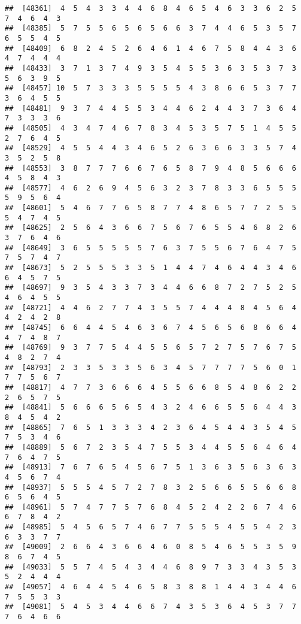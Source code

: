 \documentclass[
]{book}
\begin{document}
\begin{verbatim}
##  [48361]  4  5  4  3  3  4  4  6  8  4  6  5  4  6  3  3  6  2  5  7  4  6  4  3
##  [48385]  5  7  5  5  6  5  6  5  6  6  3  7  4  4  6  5  3  5  7  6  5  5  4  5
##  [48409]  6  8  2  4  5  2  6  4  6  1  4  6  7  5  8  4  4  3  6  4  7  4  4  4
##  [48433]  3  7  1  3  7  4  9  3  5  4  5  5  3  6  3  5  3  7  3  5  6  3  9  5
##  [48457] 10  5  7  3  3  3  5  5  5  5  4  3  8  6  6  5  3  7  7  3  6  4  5  5
##  [48481]  9  3  7  4  4  5  5  3  4  4  6  2  4  4  3  7  3  6  4  7  3  3  3  6
##  [48505]  4  3  4  7  4  6  7  8  3  4  5  3  5  7  5  1  4  5  5  2  7  6  4  5
##  [48529]  4  5  5  4  4  3  4  6  5  2  6  3  6  6  3  3  5  7  4  3  5  2  5  8
##  [48553]  3  8  7  7  7  6  6  7  6  5  8  7  9  4  8  5  6  6  6  4  5  8  4  3
##  [48577]  4  6  2  6  9  4  5  6  3  2  3  7  8  3  3  6  5  5  5  5  9  5  6  4
##  [48601]  5  4  6  7  7  6  5  8  7  7  4  8  6  5  7  7  2  5  5  5  4  7  4  5
##  [48625]  2  5  6  4  3  6  6  7  5  6  7  6  5  5  4  6  8  2  6  3  7  6  4  6
##  [48649]  3  6  5  5  5  5  5  7  6  3  7  5  5  6  7  6  4  7  5  7  5  7  4  7
##  [48673]  5  2  5  5  5  3  3  5  1  4  4  7  4  6  4  4  3  4  6  6  4  5  7  5
##  [48697]  9  3  5  4  3  3  7  3  4  4  6  6  8  7  2  7  5  2  5  4  6  4  5  5
##  [48721]  4  4  6  2  7  7  4  3  5  5  7  4  4  4  8  4  5  6  4  4  2  4  2  8
##  [48745]  6  6  4  4  5  4  6  3  6  7  4  5  6  5  6  8  6  6  4  4  7  4  8  7
##  [48769]  9  3  7  7  5  4  4  5  5  6  5  7  2  7  5  7  6  7  5  4  8  2  7  4
##  [48793]  2  3  3  5  3  3  5  6  3  4  5  7  7  7  7  5  6  0  1  7  7  5  6  7
##  [48817]  4  7  7  3  6  6  6  4  5  5  6  6  8  5  4  8  6  2  2  2  6  5  7  5
##  [48841]  5  6  6  6  5  6  5  4  3  2  4  6  6  5  5  6  4  4  3  8  4  5  4  2
##  [48865]  7  6  5  1  3  3  3  4  2  3  6  4  5  4  4  3  5  4  5  7  5  3  4  6
##  [48889]  5  6  7  2  3  5  4  7  5  5  3  4  4  5  5  6  4  6  4  7  6  4  7  5
##  [48913]  7  6  7  6  5  4  5  6  7  5  1  3  6  3  5  6  3  6  3  4  5  6  7  4
##  [48937]  5  5  5  4  5  7  2  7  8  3  2  5  6  6  5  5  6  6  8  6  5  6  4  5
##  [48961]  5  7  4  7  7  5  7  6  8  4  5  2  4  2  2  6  7  4  6  6  7  8  4  2
##  [48985]  5  4  5  6  5  7  4  6  7  7  5  5  5  4  5  5  4  2  3  6  3  3  7  7
##  [49009]  2  6  6  4  3  6  6  4  6  0  8  5  4  6  5  5  3  5  9  8  6  7  4  5
##  [49033]  5  5  7  4  5  4  3  4  4  6  8  9  7  3  3  4  3  5  3  5  2  4  4  4
##  [49057]  4  6  4  4  5  4  6  5  8  3  8  8  1  4  4  3  4  4  6  7  5  5  3  3
##  [49081]  5  4  5  3  4  4  6  6  7  4  3  5  3  6  4  5  3  7  7  7  6  4  6  6

\end{verbatim}
\end{document}
